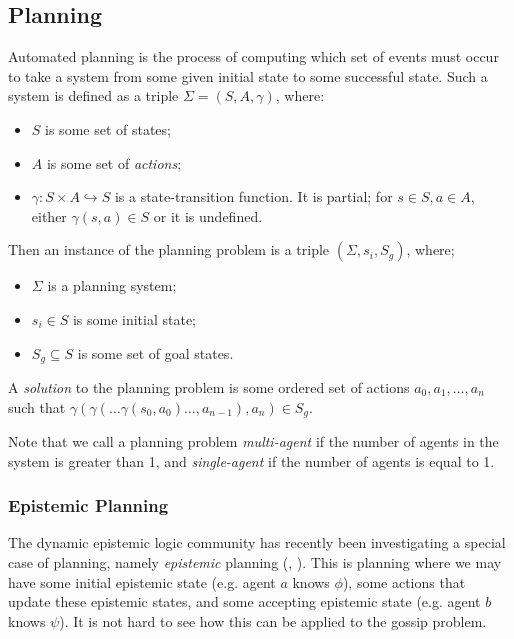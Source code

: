 \documentclass[12pt, a4paper]{article}
\begin{document}
\subsection{Planning}
\label{sec:Planning}

Automated planning is the process of computing which set of events must occur to
take a system from some given initial state to some successful state. Such a
system is defined as a triple $\Sigma = (S, A, \gamma)$, where:

\begin{itemize}
\item $S$ is some set of states;
\item $A$ is some set of \textit{actions};
\item $\gamma : S \times A \hookrightarrow S$ is a state-transition function. It
  is partial; for $s \in S, a \in A$, either $\gamma(s, a) \in S$ or it is
  undefined. 
\end{itemize}

Then an instance of the planning problem is a triple $(\Sigma, s_i, S_g)$,
where;

\begin{itemize}
\item $\Sigma$ is a planning system;
\item $s_i \in S$ is some initial state;
\item $S_g \subseteq S$ is some set of goal states.  
\end{itemize}

A \textit{solution} to the planning problem is some ordered set of actions
${a_0, a_1, \ldots, a_n}$ such that $\gamma(\gamma(\ldots \gamma(s_0, a_0)
\ldots ,a_{n-1}) ,a_n) \in S_g$. 

Note that we call a planning problem \textit{multi-agent} if the number of
agents in the system is greater than 1, and \textit{single-agent} if the number
of agents is equal to 1. 

\subsubsection{Epistemic Planning}

The dynamic epistemic logic community has recently been investigating a special case
of planning, namely \textit{epistemic} planning (\cite{BolanderEP},
\cite{UndecidabilityEP}). This is planning where we may have some initial
epistemic state (e.g. agent $a$ knows $\phi$), some actions that update these
epistemic states, and some accepting epistemic state (e.g. agent $b$ knows
$\psi$). It is not hard to see how this can be applied to the gossip problem.
\end{document}
